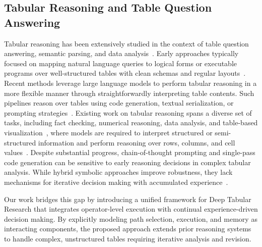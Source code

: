 \subsection{Tabular Reasoning and Table Question Answering}

Tabular reasoning has been extensively studied in the context of table question answering, semantic parsing, and data analysis~\cite{zhao2023openrt}. Early approaches typically focused on mapping natural language queries to logical forms or executable programs over well-structured tables with clean schemas and regular layouts~\cite{akhtar2023exploring,Perzina2014MicrosoftEA}. Recent methods leverage large language models to perform tabular reasoning in a more flexible manner through straightforwardly interpreting table contents. Such pipelines reason over tables using code generation, textual serialization, or prompting strategies~\cite{wang2024chain,Zhu2024AutoTQATA,Shi2024EHRAgentCE}. Existing work on tabular reasoning spans a diverse set of tasks, including fact checking, numerical reasoning, data analysis, and table-based visualization~\cite{Wu2024TableBenchAC}, where models are required to interpret structured or semi-structured information and perform reasoning over rows, columns, and cell values~\cite{Sun2024ASO}. Despite substantial progress, chain-of-thought prompting and single-pass code generation can be sensitive to early reasoning decisions in complex tabular analysis. While hybrid symbolic approaches improve robustness, they lack mechanisms for iterative decision making with accumulated experience~\cite{kulkarni2025llmsymbolicintegrationrobusttemporal}. 

Our work bridges this gap by introducing a unified framework for Deep Tabular Research that integrates operator-level execution with continual experience-driven decision making. By explicitly modeling path selection, execution, and memory as interacting components, the proposed approach extends prior reasoning systems to handle complex, unstructured tables requiring iterative analysis and revision.



